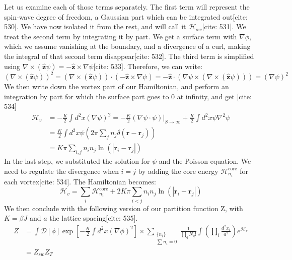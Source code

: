\documentclass[11pt]{article}
\begin{document}
Let us examine each of those terms separately. The first term will represent the spin-wave degree of freedom, a Gaussian part which can be integrated out[cite: 530]. We have now isolated it from the rest, and will call it $\mathcal{H}_{sw}$[cite: 531]. We treat the second term by integrating it by part. We get a surface term with $\nabla \phi$, which we assume vanishing at the boundary, and a divergence of a curl, making the integral of that second term disappear[cite: 532]. The third term is simplified using $\nabla \times (\hat{\mathbf{z}} \psi) = -\hat{\mathbf{z}} \times \nabla \psi$[cite: 533]. Therefore, we can write:
\begin{equation}
(\nabla \times (\hat{\mathbf{z}} \psi))^2 = (\nabla \times (\hat{\mathbf{z}} \psi)) \cdot (-\hat{\mathbf{z}} \times \nabla \psi) = -\hat{\mathbf{z}} \cdot (\nabla \psi \times (\nabla \times (\hat{\mathbf{z}} \psi))) = (\nabla \psi)^2 \label{eq:curl_term_simple}
\end{equation}
We then write down the vortex part of our Hamiltonian, and perform an integration by part for which the surface part goes to 0 at infinity, and get [cite: 534]
\begin{align}
\mathcal{H}_v &= -\frac{K}{2} \int d^2x (\nabla \psi)^2 = -\frac{K}{2} (\nabla \psi \cdot \psi)|_{S \to \infty} + \frac{K}{2} \int d^2x \psi \nabla^2 \psi \nonumber \\
             &= \frac{K}{2} \int d^2x \psi (2\pi \sum_j n_j \delta(\mathbf{r}-\mathbf{r}_j)) \nonumber \\
             &= K \pi \sum_{i,j} n_i n_j \ln(|\mathbf{r}_i - \mathbf{r}_j|) \label{eq:Hv_coulomb_raw}
\end{align}
In the last step, we substituted the solution for $\psi$ and the Poisson equation. We need to regulate the divergence when $i=j$ by adding the core energy $\mathcal{H}_{n_i}^{\text{core}}$ for each vortex[cite: 534]. The Hamiltonian becomes:
\begin{equation}
\mathcal{H}_v = \sum_i \mathcal{H}_{n_i}^{\text{core}} + 2 K \pi \sum_{i<j} n_i n_j \ln(|\mathbf{r}_i - \mathbf{r}_j|) \label{eq:Hv_coulomb_final}
\end{equation}
We then conclude with the following version of our partition function Z, with $K = \beta J$ and $a$ the lattice spacing[cite: 535].
\begin{align}
Z &= \int \mathcal{D}[\phi] \exp\left[-\frac{K}{2} \int d^2x (\nabla \phi)^2\right] \times \sum_{\substack{\{n_i\} \\ \sum n_i=0}} \frac{1}{\prod_q N_q!} \int \left( \prod_{i} \frac{d^2x_i}{a^2} \right) e^{\mathcal{H}_v} \label{eq:Z_total1} \\
  &= Z_{sw} Z_T \label{eq:Z_total2}
\end{align}
\end{document}
